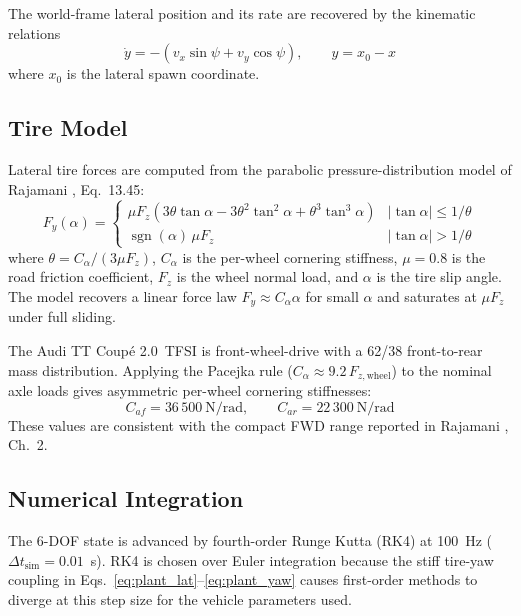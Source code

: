 \documentclass[12pt,a4paper,oneside]{report}
\begin{document}
The world-frame lateral position and its rate are recovered by the kinematic relations
\begin{equation}
\dot y = -(v_x\sin\psi + v_y\cos\psi), \qquad
y = x_0 - x
\label{eq:plant_world_y}
\end{equation}
where $x_0$ is the lateral spawn coordinate.

\subsection{Tire Model}

Lateral tire forces are computed from the parabolic pressure-distribution model of
Rajamani \cite{rajamaniVehicleDynamicsControl2005}, Eq.~13.45:
\begin{equation}
F_y(\alpha) =
\begin{cases}
\mu F_z\!\left(3\theta\tan\alpha - 3\theta^2\tan^2\!\alpha + \theta^3\tan^3\!\alpha\right)
  & |\tan\alpha| \leq 1/\theta \\
\operatorname{sgn}(\alpha)\,\mu F_z & |\tan\alpha| > 1/\theta
\end{cases}
\label{eq:tire_parabolic}
\end{equation}
where $\theta = C_\alpha/(3\mu F_z)$, $C_\alpha$ is the per-wheel cornering
stiffness, $\mu = 0.8$ is the road friction coefficient, $F_z$ is the wheel normal
load, and $\alpha$ is the tire slip angle. The model recovers a linear
force law $F_y \approx C_\alpha\alpha$ for small $\alpha$ and saturates at
$\mu F_z$ under full sliding.

The Audi TT Coup\'{e} 2.0~TFSI is front-wheel-drive with a 62/38 front-to-rear mass
distribution. Applying the Pacejka rule ($C_\alpha \approx 9.2\,F_{z,\text{wheel}}$)
to the nominal axle loads gives asymmetric per-wheel cornering stiffnesses:
\begin{equation}
C_{af} = 36\,500\ \text{N/rad}, \qquad C_{ar} = 22\,300\ \text{N/rad}
\label{eq:tire_stiffness}
\end{equation}
These values are consistent with the compact FWD range reported in Rajamani
\cite{rajamaniVehicleDynamicsControl2005}, Ch.~2.

\subsection{Numerical Integration}

The 6-DOF state is advanced by fourth-order Runge Kutta (RK4) at \SI{100}{Hz}
($\Delta t_{\text{sim}} = 0.01$~s). RK4 is chosen over Euler integration because the
stiff tire-yaw coupling in Eqs.~\eqref{eq:plant_lat}--\eqref{eq:plant_yaw} causes
first-order methods to diverge at this step size for the vehicle parameters used.
\end{document}
